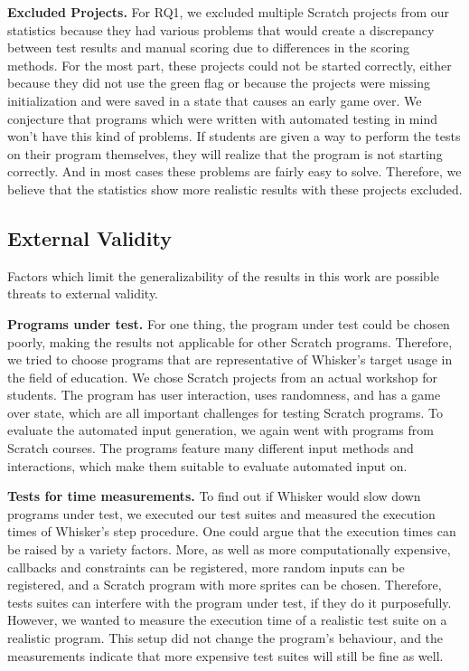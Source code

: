 \textbf{Excluded Projects.}
For RQ1, we excluded multiple Scratch projects from our statistics because they had various problems that
would create a discrepancy between test results and manual scoring due to differences in the scoring methods.
For the most part, these projects could not be started correctly,
either because they did not use the green flag or because the projects were missing initialization and were
saved in a state that causes an early game over.
We conjecture that programs which were written with automated testing in mind won't have this kind of problems.
If students are given a way to perform the tests on their program themselves, they will realize that the program is not starting correctly.
And in most cases these problems are fairly easy to solve.
Therefore, we believe that the statistics show more realistic results with these projects excluded.

\subsection{External Validity}

Factors which limit the generalizability of the results in this work are possible threats to external validity.
\parspace

\textbf{Programs under test.} For one thing, the program under test could be chosen poorly,
making the results not applicable for other Scratch programs.
Therefore, we tried to choose programs that are representative of Whisker's target usage in the field of education.
We chose Scratch projects from an actual workshop for students.
The program has user interaction, uses randomness, and has a game over state,
which are all important challenges for testing Scratch programs.
To evaluate the automated input generation,
we again went with programs from Scratch courses.
The programs feature many different input methods and interactions,
which make them suitable to evaluate automated input on.
\parspace

\textbf{Tests for time measurements.}
To find out if Whisker would slow down programs under test,
we executed our test suites and measured the execution times of Whisker's step procedure.
One could argue that the execution times can be raised by a variety factors.
More, as well as more computationally expensive, callbacks and constraints can be registered,
more random inputs can be registered,
and a Scratch program with more sprites can be chosen.
Therefore, tests suites can interfere with the program under test, if they do it purposefully.
However, we wanted to measure the execution time of a realistic test suite on a realistic program.
This setup did not change the program's behaviour,
and the measurements indicate that more expensive test suites will still be fine as well.
